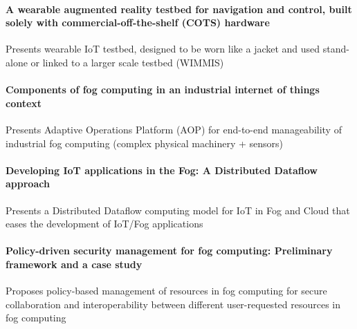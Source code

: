 \paragraph{A wearable augmented reality testbed for navigation and control, built solely with commercial-off-the-shelf (COTS) hardware} \cite{behringer_wearable_2000}
Presents wearable IoT testbed, designed to be worn like a jacket and used stand-alone or linked to a larger scale testbed (WIMMIS)

\paragraph{Components of fog computing in an industrial internet of things context}\cite{gazis_components_2015}
Presents Adaptive Operations Platform (AOP) for end-to-end manageability of industrial fog computing (complex physical machinery + sensors)

\paragraph{Developing IoT applications in the Fog: A Distributed Dataflow approach} \cite{giang_developing_2015}
Presents a Distributed Dataflow computing model for IoT in Fog and Cloud that eases the development of IoT/Fog applications

\paragraph{Policy-driven security management for fog computing: Preliminary framework and a case study} \cite{dsouza_policy-driven_2014}
Proposes policy-based management of resources in fog computing for secure collaboration and interoperabil{}ity between different user-requested resources in fog computing

